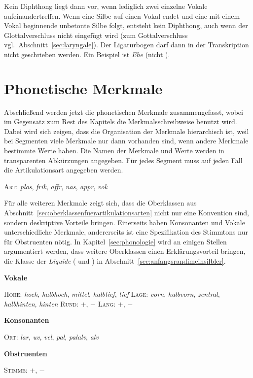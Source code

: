 Kein Diphthong liegt dann vor, wenn lediglich zwei einzelne Vokale aufeinandertreffen.
Wenn eine Silbe auf einen Vokal endet und eine mit einem Vokal beginnende unbetonte Silbe folgt, entsteht kein Diphthong, auch wenn der Glottalverschluss nicht eingefügt wird (zum Gottalverschluss vgl.\ Abschnitt~\ref{sec:laryngale}).
Der Ligaturbogen darf dann in der Transkription nicht geschrieben werden.
Ein Beispiel ist \textit{Ehe} \textipa{[Pe:@]} (nicht \Ast\textipa{[P\t{e@}]}).

\section{Phonetische Merkmale}

\label{sec:phonetischemerkmale}

Abschließend werden jetzt die phonetischen Merkmale zusammengefasst, wobei im Gegensatz zum Rest des Kapitels die Merkmalsschreibweise benutzt wird.
Dabei wird sich zeigen, dass die Organisation der Merkmale hierarchisch ist, weil bei Segmenten viele Merkmale nur dann vorhanden sind, wenn andere Merkmale bestimmte Werte haben.
Die Namen der Merkmale und Werte werden in transparenten Abkürzungen angegeben.
Für jedes Segment muss auf jeden Fall die Artikulationsart angegeben werden.

\begin{exe}
	\ex \textsc{Art}: \textit{plos}, \textit{frik}, \textit{affr}, \textit{nas}, \textit{appr}, \textit{vok}
\end{exe}

Für alle weiteren Merkmale zeigt sich, dass die Oberklassen aus Abschnitt~\ref{sec:oberklassenfuerartikulationsarten} nicht nur eine Konvention sind, sondern deskriptive Vorteile bringen.
Einerseits haben Konsonanten und Vokale unterschiedliche Merkmale, andererseits ist eine Spezifikation des Stimmtons nur für Obstruenten nötig.
In Kapitel~\ref{sec:phonologie} wird an einigen Stellen argumentiert werden, dass weitere Oberklassen einen Erklärungsvorteil bringen, \zB die Klasse der \textit{Liquide} (\textipa{[K]} und \textipa{[l]}) in Abschnitt~\ref{sec:anfangsrandimeinsilbler}.

\begin{exe}
	\ex \textbf{Vokale}
		\begin{xlist}
			\ex \textsc{Höhe}: \textit{hoch}, \textit{halbhoch}, \textit{mittel}, \textit{halbtief}, \textit{tief}
			\ex \textsc{Lage}: \textit{vorn}, \textit{halbvorn}, \textit{zentral}, \textit{halbhinten}, \textit{hinten}
			\ex \textsc{Rund}: $+$, $-$
			\ex \textsc{Lang}: $+$, $-$
		\end{xlist}
	\ex \textbf{Konsonanten}
		\begin{xlist}
			\ex \textsc{Ort}: \textit{lar}, \textit{uv}, \textit{vel}, \textit{pal}, \textit{palalv}, \textit{alv}
		\end{xlist}
	\ex \textbf{Obstruenten}
		\begin{xlist}
			\ex \textsc{Stimme}: $+$, $-$
		\end{xlist}
\end{exe}


